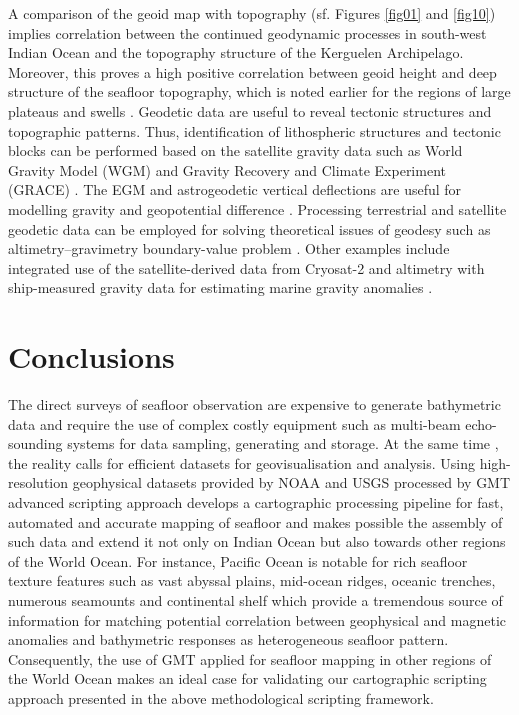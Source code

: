 \documentclass[geomatics,article,submit,pdftex,moreauthors]{Definitions/mdpi}
\begin{document}
A comparison of the geoid map with topography (sf. Figures \ref{fig01} and \ref{fig10}) implies correlation between the continued geodynamic processes in south-west Indian Ocean and the topography structure of the Kerguelen Archipelago. Moreover, this proves a high positive correlation between geoid height and deep structure of the seafloor topography, which is noted earlier for the regions of large plateaus and swells \cite{SandwellMacKenzie}. Geodetic data are useful to reveal tectonic structures and topographic patterns. Thus, identification of lithospheric structures and tectonic blocks can be performed based on the satellite gravity data such as World Gravity Model (WGM) and Gravity Recovery and Climate Experiment (GRACE) \cite{EMISHAW2023104775}. The EGM and astrogeodetic vertical deflections are useful for modelling gravity and geopotential difference \cite{WANG2023}. Processing terrestrial and satellite geodetic data can be employed for solving theoretical issues of geodesy such as altimetry–gravimetry boundary-value problem \cite{Lehmann}. Other examples include integrated use of the satellite-derived data from Cryosat-2 and altimetry with ship-measured gravity data for estimating marine gravity anomalies \cite{NGUYEN2020505}.

\section{Conclusions}

The direct surveys of seafloor observation are expensive to generate bathymetric data and require the use of complex costly equipment such as multi-beam echo-sounding systems for data sampling, generating and storage. At the same time , the reality calls for efficient datasets for geovisualisation and analysis. Using high-resolution geophysical datasets provided by NOAA and USGS processed by GMT advanced scripting approach develops a cartographic processing pipeline for fast, automated and accurate mapping of seafloor and makes possible the assembly of such data and extend it not only on Indian Ocean but also towards other regions of the World Ocean. For instance, Pacific Ocean is notable for rich seafloor texture features such as vast abyssal plains, mid-ocean ridges, oceanic trenches, numerous seamounts and continental shelf which provide a tremendous source of information for matching potential correlation between geophysical and magnetic anomalies and bathymetric responses as heterogeneous seafloor pattern. Consequently, the use of GMT applied for seafloor mapping in other regions of the World Ocean makes an ideal case for validating our cartographic scripting approach presented in the above methodological scripting framework. 
\end{document}
